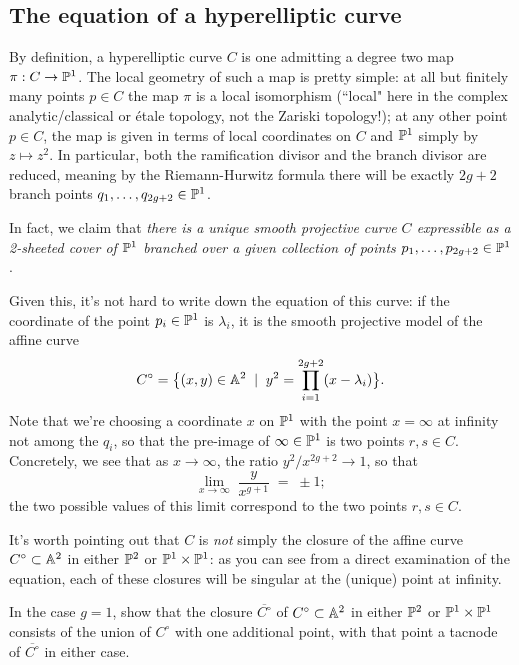  \subsection{The equation of a hyperelliptic curve}
 
  By definition, a hyperelliptic curve $C$ is one admitting a degree two map $\pi : C \to \PP^1$. The local geometry of such a map is pretty simple: at all but finitely many points $p \in C$ the map $\pi$ is a local isomorphism (``local" here in the complex analytic/classical or \'etale topology, not the Zariski topology!); at any other point $p \in C$, the map is given in terms of local coordinates on $C$ and $\PP^1$ simply by $z \mapsto z^2$. In particular, both the ramification divisor and the branch divisor are reduced, meaning by the Riemann-Hurwitz formula there will be exactly $2g+2$ branch points $q_1,\dots,q_{2g+2} \in \PP^1$.
  
  In fact, we claim that \emph{there is a unique smooth projective curve $C$ expressible as a 2-sheeted cover of $\PP^1$ branched over a given collection of points $p_1,\dots,p_{2g+2} \in \PP^1$}. 
  
  Given this, it's not hard to write down the equation of this curve: if the coordinate of the point $p_i \in \PP^1$ is $\lambda_i$, it is the smooth projective model of the affine curve 
  $$
C^\circ = \big\{ (x,y) \in \AA^2 \; \mid \; y^2 = \prod_{i=1}^{2g+2} (x - \lambda_i) \big\}.
$$ 
Note that we're choosing a coordinate $x$ on $\PP^1$ with the point $x = \infty$ at infinity not among the $q_i$, so that the pre-image of $\infty \in \PP^1$ is two points $r, s \in C$. Concretely, we see that as $x \to \infty$, the ratio $y^2/x^{2g+2} \to 1$, so that 
$$
\lim_{x \to \infty} \; \frac{y}{x^{g+1}} \; = \; \pm 1;
$$
  the two possible values of this limit correspond to the two points $r,s \in C$.
  
  It's worth pointing out that $C$ is \emph{not} simply the closure of the affine curve $C^\circ \subset \AA^2$ in either $\PP^2$ or $\PP^1 \times \PP^1$: as you can see from a direct examination of the equation, each of these closures will be singular at the (unique) point at infinity.
  
  \begin{exercise}
  In the case $g=1$, show that the closure $\overline{C^\circ}$ of $C^\circ \subset \AA^2$ in either $\PP^2$ or $\PP^1 \times \PP^1$ consists of the union of $C^\circ$ with one additional point, with that point a tacnode of $\overline{C^\circ}$ in either case.
  \end{exercise}
  
